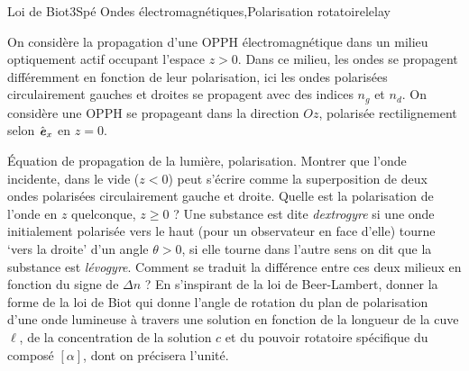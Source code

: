 \begin{exercise}{Loi de Biot}{3}{Spé}
{Ondes électromagnétiques,Polarisation rotatoire}{lelay}

On considère la propagation d'une OPPH électromagnétique dans un milieu optiquement actif occupant l'espace $z > 0$. Dans ce milieu, les ondes se propagent différemment en fonction de leur polarisation, ici les ondes polarisées circulairement gauches et droites se propagent avec des indices $n_g$ et $n_d$. On considère une OPPH se propageant dans la direction $Oz$, polarisée rectilignement selon $\hat{\bm{\mathit{e}}}_x$ en $z=0$.
\begin{questions}
    \questioncours Équation de propagation de la lumière, polarisation.
    \question Montrer que l'onde incidente, dans le vide ($z < 0$) peut s'écrire comme la superposition de deux ondes polarisées circulairement gauche et droite.
    \question Quelle est la polarisation de l'onde en $z$ quelconque, $z \geq 0$ ?
    \question Une substance est dite \textit{dextrogyre} si une onde initialement polarisée vers le haut (pour un observateur en face d'elle) tourne `vers la droite' d'un angle $\theta >0$, si elle tourne dans l'autre sens on dit que la substance est \textit{lévogyre}. Comment se traduit la différence entre ces deux milieux en fonction du signe de $\Delta n$ ?
    \question En s'inspirant de la loi de Beer-Lambert, donner la forme de la loi de Biot qui donne l'angle de rotation du plan de polarisation d'une onde lumineuse à travers une solution en fonction de la longueur de la cuve $\ell$, de la concentration de la solution $c$ et du pouvoir rotatoire spécifique du composé $[\alpha]$, dont on précisera l'unité.
\end{questions}

\end{exercise}